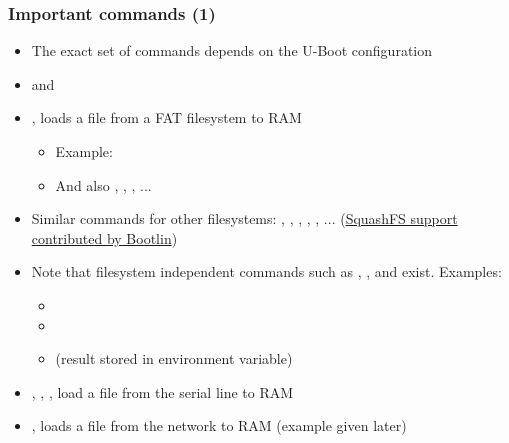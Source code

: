 \begin{frame}
  \frametitle{Important commands (1)}
  \begin{itemize}
  \item The exact set of commands depends on the U-Boot configuration
  \item {} and 
  \item {}, loads a file from a FAT filesystem to RAM
    \begin{itemize}
    \item Example: 
    \item And also , , ,
          ...
    \end{itemize}
  \item Similar commands for other filesystems: , ,
      , , , ...
      (\href{https://bootlin.com/blog/bootlin-contributes-squashfs-support-to-u-boot/}{SquashFS
      support contributed by Bootlin})
  \item Note that filesystem independent commands such as ,
        , and  exist. Examples:
    \begin{itemize}
    \item {}
    \item {}
    \item {} (result stored in  environment variable)
    \end{itemize}
  \item {}, , , load a file from the
    serial line to RAM
  \item {}, loads a file from the network to RAM (example given later)
  \end{itemize}
\end{frame}

